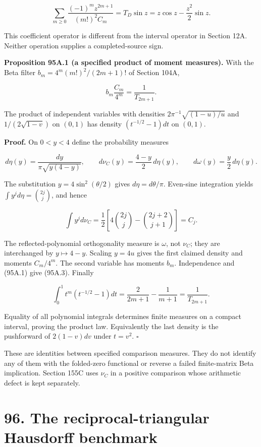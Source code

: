 \documentclass[
  11pt,
]{book}
\begin{document}
\[
\boxed{\sum_{m\ge0}\frac{(-1)^mz^{2m+1}}{(m!)^2C_m}
=T_D\sin z=z\cos z-\frac{z^2}{2}\sin z.}
\tag{95A.2}
\]

This coefficient operator is different from the interval operator in
Section 12A. Neither operation supplies a completed-source sign.

\textbf{Proposition 95A.1 (a specified product of moment measures).}
With the Beta filter \(b_m=4^m(m!)^2/(2m+1)!\) of Section 104A,

\[
\boxed{b_m\frac{C_m}{4^m}=\frac1{T_{2m+1}}.}
\tag{95A.3}
\]

The product of independent variables with densities
\(2\pi^{-1}\sqrt{(1-u)/u}\) and \(1/(2\sqrt{1-v})\) on \((0,1)\) has
density \((t^{-1/2}-1)dt\) on \((0,1)\).

\textbf{Proof.} On \(0<y<4\) define the probability measures

\[
 d\eta(y)=\frac{dy}{\pi\sqrt{y(4-y)}},\qquad
 d\nu_C(y)=\frac{4-y}{2}\,d\eta(y),\qquad
 d\omega(y)=\frac y2\,d\eta(y).
\tag{95A.4}
\]

The substitution \(y=4\sin^2(\theta/2)\) gives \(d\eta=d\theta/\pi\).
Even-sine integration yields \(\int y^j d\eta=\binom{2j}{j}\), and hence

\[
\int y^j d\nu_C
=\frac12\left[4\binom{2j}{j}-\binom{2j+2}{j+1}\right]=C_j.
\]

The reflected-polynomial orthogonality measure is \(\omega\), not
\(\nu_C\); they are interchanged by \(y\mapsto4-y\). Scaling \(y=4u\)
gives the first claimed density and moments \(C_m/4^m\). The second
variable has moments \(b_m\). Independence and (95A.1) give (95A.3).
Finally

\[
\int_0^1t^m(t^{-1/2}-1)dt
=\frac2{2m+1}-\frac1{m+1}=\frac1{T_{2m+1}}.
\tag{95A.5}
\]

Equality of all polynomial integrals determines finite measures on a
compact interval, proving the product law. Equivalently the last density
is the pushforward of \(2(1-v)dv\) under \(t=v^2\). \(\square\)

These are identities between specified comparison measures. They do not
identify any of them with the folded-zero functional or reverse a failed
finite-matrix Beta implication. Section 155C uses \(\nu_C\) in a
positive comparison whose arithmetic defect is kept separately.

\section{96. The reciprocal-triangular Hausdorff
benchmark}\label{the-reciprocal-triangular-hausdorff-benchmark}
\end{document}

